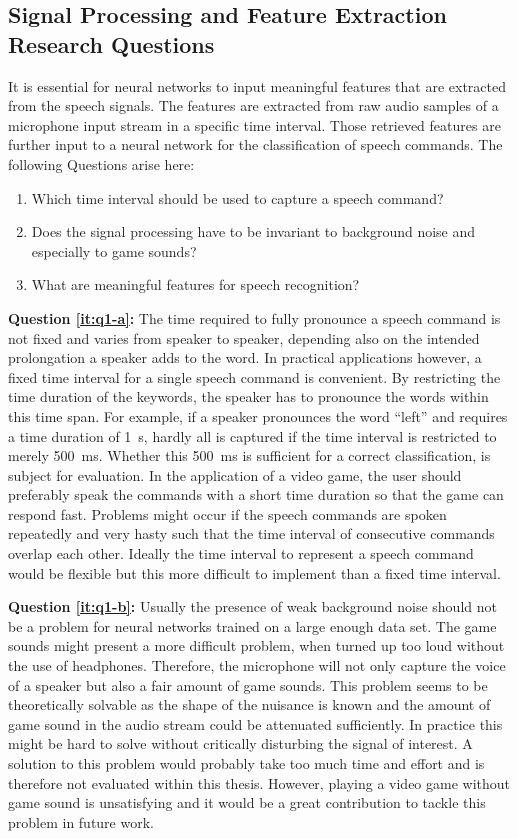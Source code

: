 \subsection{Signal Processing and Feature Extraction Research Questions}\label{sec:intro_rq_signal}
It is essential for neural networks to input meaningful features that are extracted from the speech signals. 
The features are extracted from raw audio samples of a microphone input stream in a specific time interval.
Those retrieved features are further input to a neural network for the classification of speech commands.
The following Questions arise here:
\begin{enumerate}[label={Q.1.\alph*)}, leftmargin=1.75cm]
  \item Which time interval should be used to capture a speech command?\label{it:q1-a}
  \item Does the signal processing have to be invariant to background noise and especially to game sounds?\label{it:q1-b}
  \item What are meaningful features for speech recognition?\label{it:q1-c}
\end{enumerate}
\noindent
\textbf{Question \ref{it:q1-a}:} 
The time required to fully pronounce a speech command is not fixed and varies from speaker to speaker, depending also on the intended prolongation a speaker adds to the word.
In practical applications however, a fixed time interval for a single speech command is convenient.
By restricting the time duration of the keywords, the speaker has to pronounce the words within this time span.
For example, if a speaker pronounces the word \enquote{left} and requires a time duration of \SI{1}{\second}, hardly all is captured if the time interval is restricted to merely \SI{500}{\milli\second}.
Whether this \SI{500}{\milli\second} is sufficient for a correct classification, is subject for evaluation.
In the application of a video game, the user should preferably speak the commands with a short time duration so that the game can respond fast.
Problems might occur if the speech commands are spoken repeatedly and very hasty such that the time interval of consecutive commands overlap each other.
Ideally the time interval to represent a speech command would be flexible but this more difficult to implement than a fixed time interval.

\textbf{Question \ref{it:q1-b}:}
Usually the presence of weak background noise should not be a problem for neural networks trained on a large enough data set. 
The game sounds might present a more difficult problem, when turned up too loud without the use of headphones. 
Therefore, the microphone will not only capture the voice of a speaker but also a fair amount of game sounds. 
This problem seems to be theoretically solvable as the shape of the nuisance is known and the amount of game sound in the audio stream could be attenuated sufficiently.
In practice this might be hard to solve without critically disturbing the signal of interest.
A solution to this problem would probably take too much time and effort and is therefore not evaluated within this thesis. 
However, playing a video game without game sound is unsatisfying and it would be a great contribution to tackle this problem in future work.

